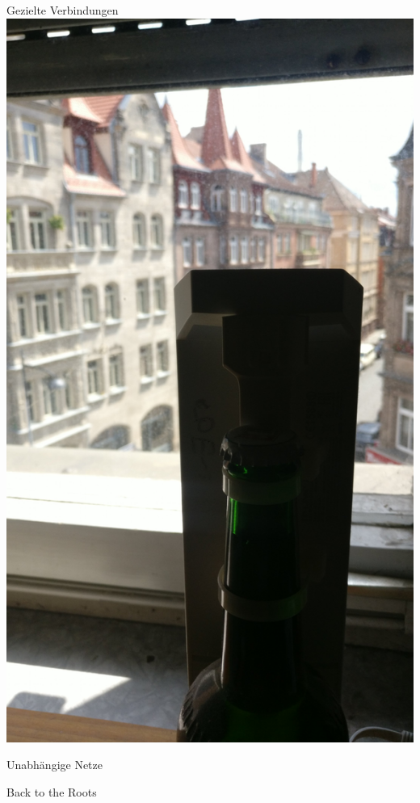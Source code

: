 \documentclass{beamer}
\begin{document}
		\begin{frame}[standout]{Gezielte Verbindungen}
        \includegraphics[height=\framewidth]{media/p2p-flasche2.jpg}
	\end{frame}
	\begin{frame}{Unabhängige Netze}
	\end{frame}
	\begin{frame}{Back to the Roots}
	\end{frame}
\end{document}
